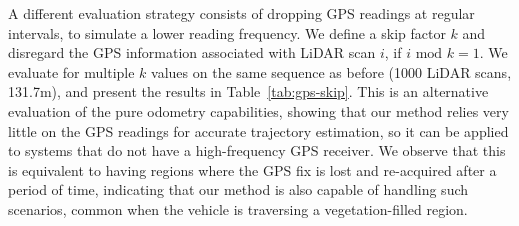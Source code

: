 A different evaluation strategy consists of dropping GPS readings at regular intervals, to simulate a lower reading frequency. We define a skip factor $k$ and disregard the GPS information associated with LiDAR scan $i$, if $i \text{ mod } k =1$. We evaluate for multiple $k$ values on the same sequence as before (1000 LiDAR scans, 131.7m), and present the results in Table~\ref{tab:gps-skip}. This is an alternative evaluation of the pure odometry capabilities, showing that our method relies very little on the GPS readings for accurate trajectory estimation, so it can be applied to systems that do not have a high-frequency GPS receiver. We observe that this is equivalent to having regions where the GPS fix is lost and re-acquired after a period of time, indicating that our method is also capable of handling such scenarios, common when the vehicle is traversing a vegetation-filled region.


